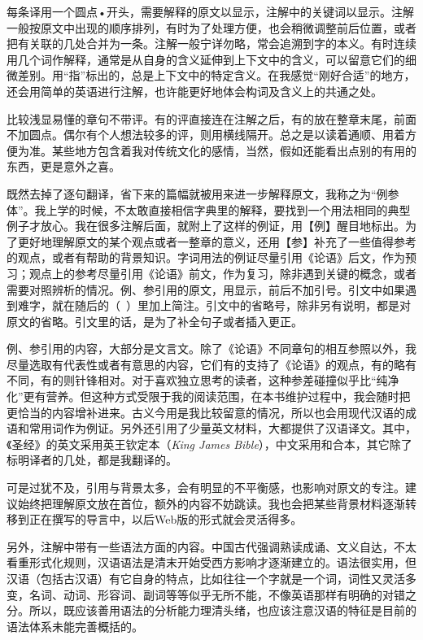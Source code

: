 每条译用一个圆点•开头，需要解释的原文以显示，注解中的关键词以显示。注解一般按原文中出现的顺序排列，有时为了处理方便，也会稍微调整前后位置，或者把有关联的几处合并为一条。注解一般宁详勿略，常会追溯到字的本义。有时连续用几个词作解释，通常是从自身的含义延伸到上下文中的含义，可以留意它们的细微差别。用“指”标出的，总是上下文中的特定含义。在我感觉“刚好合适”的地方，还会用简单的英语进行注解，也许能更好地体会构词及含义上的共通之处。

比较浅显易懂的章句不带评。有的评直接连在注解之后，有的放在整章末尾，前面不加圆点。偶尔有个人想法较多的评，则用横线隔开。总之是以读着通顺、用着方便为准。某些地方包含着我对传统文化的感情，当然，假如还能看出点别的有用的东西，更是意外之喜。

既然去掉了逐句翻译，省下来的篇幅就被用来进一步解释原文，我称之为“例参体”。我上学的时候，不太敢直接相信字典里的解释，要找到一个用法相同的典型例子才放心。我在很多注解后面，就附上了这样的例证，用【例】醒目地标出。为了更好地理解原文的某个观点或者一整章的意义，还用【参】补充了一些值得参考的观点，或者有帮助的背景知识。字词用法的例证尽量引用《论语》后文，作为预习；观点上的参考尽量引用《论语》前文，作为复习，除非遇到关键的概念，或者需要对照辨析的情况。例、参引用的原文，用显示，前后不加引号。引文中如果遇到难字，就在随后的（~）里加上简注。引文中的省略号，除非另有说明，都是对原文的省略。引文里的话，是为了补全句子或者插入更正。

例、参引用的内容，大部分是文言文。除了《论语》不同章句的相互参照以外，我尽量选取有代表性或者有意思的内容，它们有的支持了《论语》的观点，有的略有不同，有的则针锋相对。对于喜欢独立思考的读者，这种参差碰撞似乎比“纯净化”更有营养。但这种方式受限于我的阅读范围，在本书维护过程中，我会随时把更恰当的内容增补进来。古义今用是我比较留意的情况，所以也会用现代汉语的成语和常用词作为例证。另外还引用了少量英文材料，大都提供了汉语译文。其中，《圣经》的英文采用英王钦定本（\emph{King James Bible}），中文采用和合本，其它除了标明译者的几处，都是我翻译的。

可是过犹不及，引用与背景太多，会有明显的不平衡感，也影响对原文的专注。建议始终把理解原文放在首位，额外的内容不妨跳读。我也会把某些背景材料逐渐转移到正在撰写的导言中，以后Web版的形式就会灵活得多。

另外，注解中带有一些语法方面的内容。中国古代强调熟读成诵、文义自达，不太看重形式化规则，汉语语法是清末开始受西方影响才逐渐建立的。语法很实用，但汉语（包括古汉语）有它自身的特点，比如往往一个字就是一个词，词性又灵活多变，名词、动词、形容词、副词等等似乎无所不能，不像英语那样有明确的对错之分。所以，既应该善用语法的分析能力理清头绪，也应该注意汉语的特征是目前的语法体系未能完善概括的。

